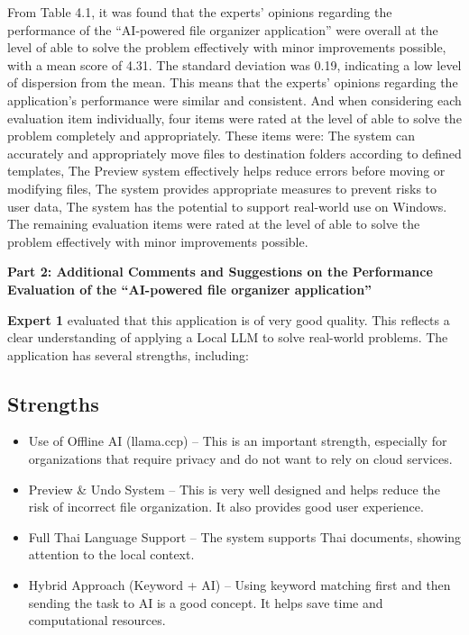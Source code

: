 \documentclass[12pt,oneside,openright,a4paper]{cpe-english-project}
\begin{document}
From Table 4.1, it was found that the experts' opinions regarding the performance of the ``AI-powered file organizer application'' were overall at the level of able to solve the problem effectively with minor improvements possible, with a mean score of 4.31. The standard deviation was 0.19, indicating a low level of dispersion from the mean. This means that the experts' opinions regarding the application's performance were similar and consistent. And when considering each evaluation item individually, four items were rated at the level of able to solve the problem completely and appropriately. These items were: The system can accurately and appropriately move files to destination folders according to defined templates, The Preview system effectively helps reduce errors before moving or modifying files, The system provides appropriate measures to prevent risks to user data, The system has the potential to support real-world use on Windows. The remaining evaluation items were rated at the level of able to solve the problem effectively with minor improvements possible.

\bigskip
\noindent\textbf{Part 2: Additional Comments and Suggestions on the Performance Evaluation of the ``AI-powered file organizer application''}

\bigskip
\noindent\textbf{Expert 1} evaluated that this application is of very good quality. This reflects a clear understanding of applying a Local LLM to solve real-world problems. The application has several strengths, including:

\subsection*{Strengths}
\begin{itemize}
\item Use of Offline AI (llama.ccp) -- This is an important strength, especially for organizations that require privacy and do not want to rely on cloud services.
\item Preview \& Undo System -- This is very well designed and helps reduce the risk of incorrect file organization. It also provides good user experience.
\item Full Thai Language Support -- The system supports Thai documents, showing attention to the local context.
\item Hybrid Approach (Keyword + AI) -- Using keyword matching first and then sending the task to AI is a good concept. It helps save time and computational resources.
\end{itemize}
\end{document}
